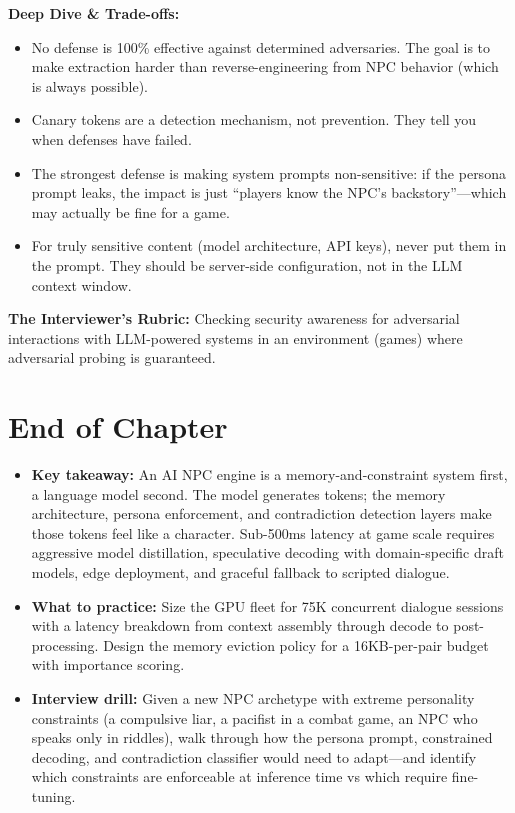 \textbf{Deep Dive \& Trade-offs:}
\begin{itemize}
  \item No defense is 100\% effective against determined adversaries. The goal is to make extraction harder than reverse-engineering from NPC behavior (which is always possible).
  \item Canary tokens are a detection mechanism, not prevention. They tell you when defenses have failed.
  \item The strongest defense is making system prompts non-sensitive: if the persona prompt leaks, the impact is just ``players know the NPC's backstory''---which may actually be fine for a game.
  \item For truly sensitive content (model architecture, API keys), never put them in the prompt. They should be server-side configuration, not in the LLM context window.
\end{itemize}

\textbf{The Interviewer's Rubric:} Checking security awareness for adversarial interactions with LLM-powered systems in an environment (games) where adversarial probing is guaranteed.

\section*{End of Chapter}
\begin{itemize}
  \item \textbf{Key takeaway:} An AI NPC engine is a memory-and-constraint system first, a language model second. The model generates tokens; the memory architecture, persona enforcement, and contradiction detection layers make those tokens feel like a character. Sub-500ms latency at game scale requires aggressive model distillation, speculative decoding with domain-specific draft models, edge deployment, and graceful fallback to scripted dialogue.
  \item \textbf{What to practice:} Size the GPU fleet for 75K concurrent dialogue sessions with a latency breakdown from context assembly through decode to post-processing. Design the memory eviction policy for a 16KB-per-pair budget with importance scoring.
  \item \textbf{Interview drill:} Given a new NPC archetype with extreme personality constraints (a compulsive liar, a pacifist in a combat game, an NPC who speaks only in riddles), walk through how the persona prompt, constrained decoding, and contradiction classifier would need to adapt---and identify which constraints are enforceable at inference time vs which require fine-tuning.
\end{itemize}
